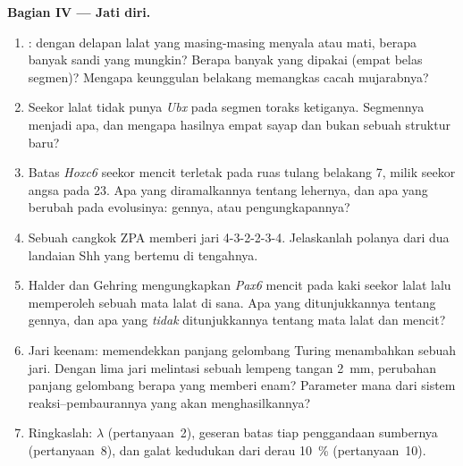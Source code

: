 \begin{problem}
\medskip
\noindent\textbf{Bagian IV --- Jati diri.}
\begin{enumerate}[resume]
  \item {}: dengan delapan  lalat yang masing-masing menyala atau mati, berapa banyak
        sandi yang mungkin? Berapa banyak yang dipakai (empat belas segmen)? Mengapa
        keunggulan belakang memangkas cacah mujarabnya?
  \item Seekor lalat tidak punya \emph{Ubx} pada segmen toraks ketiganya. Segmennya
        menjadi apa, dan mengapa hasilnya empat sayap dan bukan sebuah
        struktur baru?
  \item Batas \emph{Hoxc6} seekor mencit terletak pada ruas tulang belakang 7, milik seekor angsa pada
        23. Apa yang diramalkannya tentang lehernya, dan apa yang berubah
        pada evolusinya: gennya, atau pengungkapannya?
  \item Sebuah cangkok ZPA memberi jari 4-3-2-2-3-4. Jelaskanlah polanya dari
        dua landaian Shh yang bertemu di tengahnya.
  \item Halder dan Gehring mengungkapkan \emph{Pax6} mencit pada kaki seekor lalat
        lalu memperoleh sebuah mata lalat di sana. Apa yang ditunjukkannya tentang
        gennya, dan apa yang \emph{tidak} ditunjukkannya tentang mata lalat
        dan mencit?
  \item Jari keenam: memendekkan panjang gelombang Turing menambahkan sebuah jari.
        Dengan lima jari melintasi sebuah lempeng tangan \qty{2}{mm}, perubahan panjang
        gelombang berapa yang memberi enam? Parameter mana dari sistem
        reaksi--pembaurannya yang akan menghasilkannya?
  \item Ringkaslah: $\lambda$ (pertanyaan~2), geseran batas tiap
        penggandaan sumbernya (pertanyaan~8), dan galat kedudukan
        dari derau \qty{10}{\%} (pertanyaan~10).
\end{enumerate}
\end{problem}
